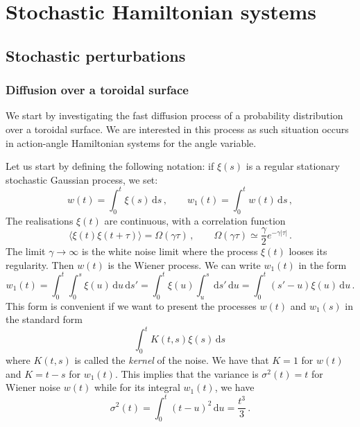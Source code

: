 
\chapter{Stochastic Hamiltonian systems}\label{ch:the_diffusive_framework}




\section{Stochastic perturbations}

\subsection{Diffusion over a toroidal surface}
\label{subsec:Diffusion for a stochastically perturbed integrable system}

We start by investigating the fast diffusion process of a probability distribution over a toroidal surface. We are interested in this process as such situation occurs in action-angle Hamiltonian systems for the angle variable.

Let us start by defining the following notation: if $\xi(s)$ is a regular stationary stochastic Gaussian process, we set:
\begin{equation}
	w(t) = \int_0^t \xi(s)\,\mathrm{d}s \,, \qquad w_1(t)=\int_0^t w(t)\,\mathrm{d}s \,,
\end{equation}
The realisations $\xi(t)$ are continuous, with a correlation function 
\begin{equation}
    \langle\xi(t)\xi(t+\tau)\rangle = \Omega(\gamma\tau) \,,\qquad \Omega(\gamma\tau) \simeq \frac{\gamma}{2}e^{-\gamma|\tau|}\,.
\end{equation}
The limit $\gamma\to\infty$ is the white noise limit where the process $\xi(t)$ looses its regularity. Then $w(t)$ is the Wiener process. We can write \(w_1(t)\) in the form
\begin{equation}
	w_1(t) = \int_0^t \int_0^s \xi(u)\,\mathrm{d}u\,\mathrm{d}s' = \int_0^t \xi(u)\int_u^s\,\mathrm{d}s'\,\mathrm{d}u = \int_0^t (s'-u)\xi(u)\,\mathrm{d}u \,.
\end{equation}
This form is convenient if we want to present the processes \(w(t)\) and \(w_1(s)\) in the standard form 
\begin{equation}
	\int_0^t K(t,s)\xi(s)\,\mathrm{d}s \,
\end{equation}
where \(K(t,s)\) is called the \textit{kernel} of the noise. We have that \(K=1\) for \(w(t)\) and \(K=t-s\) for \(w_1(t)\). This implies that the variance is \(\sigma^2(t) = t\) for Wiener noise \(w(t)\) while for its integral \(w_1(t)\), we have
\begin{equation}
	\sigma^2(t) = \int_0^t (t-u)^2\,\mathrm{d}u = \frac{t^3}{3} \,.
\end{equation}

